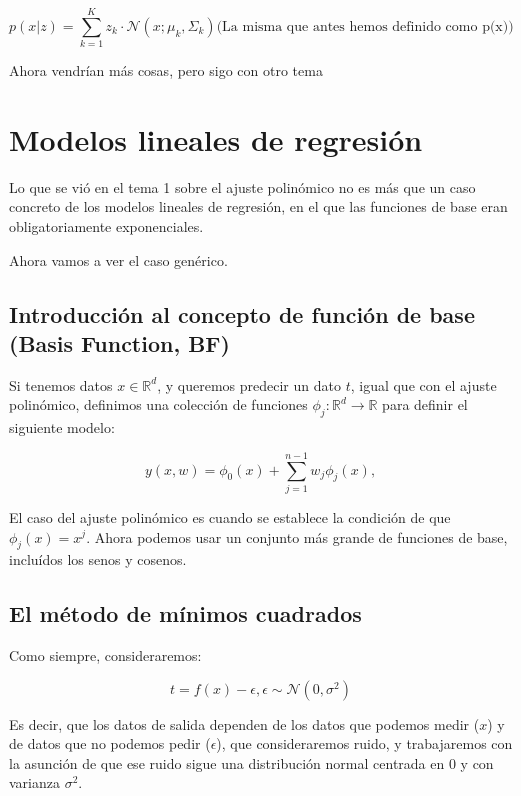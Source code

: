 \documentclass[a4paper,10pt]{article}
\begin{document}
\begin{equation*}
p(x | z) = \sum_{k = 1}^{K} z_k \cdot \mathcal{N}(x; \mu_k, \Sigma_k) \text{(La misma que antes hemos definido como p(x))}
\end{equation*}




Ahora vendrían más cosas, pero sigo con otro tema

\section{Modelos lineales de regresión}
Lo que se vió en el tema 1 sobre el ajuste polinómico no es más que un caso concreto de los modelos lineales de regresión,
en el que las funciones de base eran obligatoriamente exponenciales.

Ahora vamos a ver el caso genérico.

\subsection{Introducción al concepto de función de base (Basis Function, BF)}
Si tenemos datos $x \in \mathbb{R}^d$, y queremos predecir un dato $t$, igual que con el ajuste polinómico, definimos una colección de funciones $\phi_j: \mathbb{R}^d \rightarrow \mathbb{R}$ para definir el siguiente modelo:


\begin{equation*}
y(x,w) = \phi_0(x) + \sum_{j = 1}^{n-1} w_j\phi_j(x), 
\end{equation*}

El caso del ajuste polinómico es cuando se establece la condición de que $\phi_j(x) = x^j$. Ahora podemos usar un conjunto
más grande de funciones de base, incluídos los senos y cosenos.

\subsection{El método de mínimos cuadrados}
Como siempre, consideraremos:

\begin{equation*}
t = f(x) - \epsilon, \epsilon \sim \mathcal{N}(0, \sigma^2)
\end{equation*}

Es decir, que los datos de salida dependen de los datos que podemos medir ($x$) y de datos que no podemos pedir ($\epsilon$), que consideraremos ruido, y trabajaremos con la asunción de que ese ruido sigue una distribución normal centrada en $0$ y con varianza $\sigma^2$.
\end{document}
